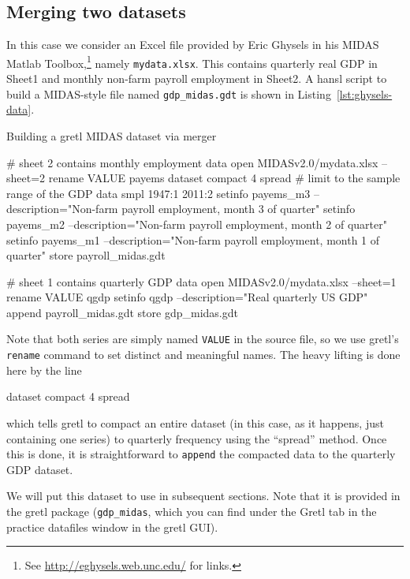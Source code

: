 \subsection{Merging two datasets}
\label{sec:data-merge}

In this case we consider an Excel file provided by Eric Ghysels in his
\textsf{MIDAS Matlab Toolbox},\footnote{See
  \url{http://eghysels.web.unc.edu/} for links.} namely
\texttt{mydata.xlsx}.  This contains quarterly real GDP in Sheet1 and
monthly non-farm payroll employment in Sheet2. A hansl script to build
a MIDAS-style file named \texttt{gdp\_midas.gdt} is shown in
Listing~\ref{lst:ghysels-data}.

\begin{script}[htbp]
  \caption{Building a gretl MIDAS dataset via merger}
  \label{lst:ghysels-data}
\begin{scode}
# sheet 2 contains monthly employment data
open MIDASv2.0/mydata.xlsx --sheet=2
rename VALUE payems
dataset compact 4 spread
# limit to the sample range of the GDP data
smpl 1947:1 2011:2
setinfo payems_m3 --description="Non-farm payroll employment, month 3 of quarter"
setinfo payems_m2 --description="Non-farm payroll employment, month 2 of quarter"
setinfo payems_m1 --description="Non-farm payroll employment, month 1 of quarter"
store payroll_midas.gdt

# sheet 1 contains quarterly GDP data
open MIDASv2.0/mydata.xlsx --sheet=1
rename VALUE qgdp
setinfo qgdp --description="Real quarterly US GDP"
append payroll_midas.gdt
store gdp_midas.gdt
\end{scode}
\end{script}

Note that both series are simply named \texttt{VALUE} in the source
file, so we use gretl's \texttt{rename} command to set distinct and
meaningful names. The heavy lifting is done here by the line
%
\begin{code}
dataset compact 4 spread
\end{code}
%
which tells gretl to compact an entire dataset (in this case, as it
happens, just containing one series) to quarterly frequency using the
``spread'' method. Once this is done, it is straightforward to
\texttt{append} the compacted data to the quarterly GDP dataset.

We will put this dataset to use in subsequent sections. Note that it
is provided in the gretl package (\texttt{gdp\_midas}, which you can
find under the \textsf{Gretl} tab in the practice datafiles window
in the gretl GUI).

